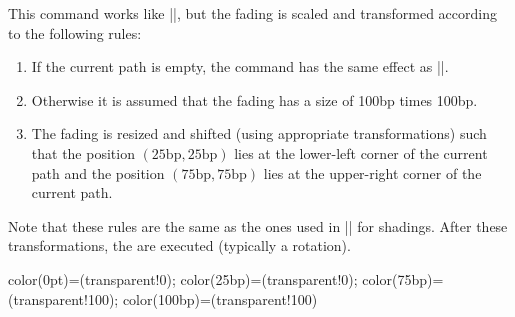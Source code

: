 \begin{command}{\pgfsetfadingforcurrentpath{}}
    This command works like |\pgfsetfading|, but the fading is scaled and
    transformed according to the following rules:
    \begin{enumerate}
        \item If the current path is empty, the command has the same effect as
            |\pgfsetfading|.
        \item Otherwise it is assumed that the fading has a size of 100bp times
            100bp.
        \item The fading is resized and shifted (using appropriate
            transformations) such that the position
            $(25\mathrm{bp},25\mathrm{bp})$ lies at the lower-left corner of
            the current path and the position $(75\mathrm{bp},75\mathrm{bp})$
            lies at the upper-right corner of the current path.
    \end{enumerate}
    Note that these rules are the same as the ones used in |\pgfshadepath| for
    shadings. After these transformations, the  are
    executed (typically a rotation).
\begin{codeexample}[]
{ color(0pt)=(transparent!0);    color(25bp)=(transparent!0);
  color(75bp)=(transparent!100); color(100bp)=(transparent!100)}


\end{codeexample}
\end{command}

